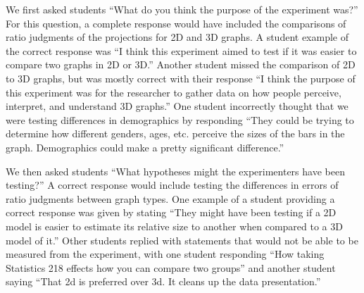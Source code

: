 \documentclass[
  12pt,
]{article}
\providecommand{\DIFdel}[1]{} %
\providecommand{\DIFadd}[1]{{\protect\color{blue} \sf #1}} %
\providecommand{\DIFdel}[1]{{\protect\color{red} [..\footnote{removed: #1} ]}} %
\providecommand{\DIFaddbegin}{} %
\providecommand{\DIFaddend}{} %
\providecommand{\DIFdelbegin}{} %
\providecommand{\DIFdelend}{} %
\newcommand{\DIFscaledelfig}{0.5}
\newlength{\DIFdelgraphicswidth} %
\newlength{\DIFdelgraphicsheight} %
\newcommand{\DIFaddincludegraphics}[2][]{{\color{blue}\fbox{\DIFOincludegraphics[#1]{#2}}}} %
\newcommand{\DIFdelincludegraphics}[2][]{%
\sbox{\DIFdelgraphicsbox}{\DIFOincludegraphics[#1]{#2}}%
\settoboxwidth{\DIFdelgraphicswidth}{\DIFdelgraphicsbox} %
\settoboxtotalheight{\DIFdelgraphicsheight}{\DIFdelgraphicsbox} %
\scalebox{\DIFscaledelfig}{%
\parbox[b]{\DIFdelgraphicswidth}{\usebox{\DIFdelgraphicsbox}\\[-\baselineskip] \rule{\DIFdelgraphicswidth}{0em}}\llap{\resizebox{\DIFdelgraphicswidth}{\DIFdelgraphicsheight}{%
\setlength{\unitlength}{\DIFdelgraphicswidth}%
\begin{picture}(1,1)%
\thicklines\linethickness{2pt} %
{\color[rgb]{1,0,0}\put(0,0){\framebox(1,1){}}}%
{\color[rgb]{1,0,0}\put(0,0){\line( 1,1){1}}}%
{\color[rgb]{1,0,0}\put(0,1){\line(1,-1){1}}}%
\end{picture}%
}\hspace*{3pt}}} %
} %
\DeclareRobustCommand{\DIFaddbegin}{\DIFOaddbegin \let\includegraphics\DIFaddincludegraphics} %
\DeclareRobustCommand{\DIFaddend}{\DIFOaddend \let\includegraphics\DIFOincludegraphics} %
\DeclareRobustCommand{\DIFdelbegin}{\DIFOdelbegin \let\includegraphics\DIFdelincludegraphics} %
\DeclareRobustCommand{\DIFdelend}{\DIFOaddend \let\includegraphics\DIFOincludegraphics} %
\begin{document}
\DIFdelbegin \DIFdel{When students were asked }\DIFdelend \DIFaddbegin \DIFadd{We first asked students }\DIFaddend ``What do you think the purpose of the
experiment was?'' \DIFdelbegin \DIFdel{, one student responded ``They could be trying to
determine how different genders, ages, etc. perceive the sizes of the
bars in the graph.Demographics could make a pretty significant
difference.}\DIFdelend \DIFaddbegin \DIFadd{For this question, a complete response would have
included the comparisons of ratio judgments of the projections for 2D
and 3D graphs. A student example of the correct response was ``I think
this experiment aimed to test if it was easier to compare two graphs in
2D or 3D.}\DIFaddend '' Another student \DIFdelbegin \DIFdel{responded }\DIFdelend \DIFaddbegin \DIFadd{missed the comparison of 2D to 3D graphs,
but was mostly correct with their response }\DIFaddend ``I think the purpose of this
experiment was for the researcher to gather data on how people perceive,
interpret, and understand 3D graphs.'' \DIFdelbegin \DIFdel{A third student correctly
commented ``I think this experiment aimed to test if it was easier to
compare two graphs in 2D or 3D.'' For this question, a complete response
would have included the comparisons of ratio judgements of the projections for 2D and 3D graphs. }\DIFdelend \DIFaddbegin \DIFadd{One student incorrectly thought
that we were testing differences in demographics by responding ``They
could be trying to determine how different genders, ages, etc. perceive
the sizes of the bars in the graph. Demographics could make a pretty
significant difference.''
}\DIFaddend 

We then asked students ``What hypotheses might the experimenters have
been testing?'' A correct response would include \DIFdelbegin \DIFdel{measuring differences
in accuracy of ratio judgements between 2D and 3D graphs. One student
correctly identified this by responding }\DIFdelend \DIFaddbegin \DIFadd{testing the differences
in errors of ratio judgments between graph types. One example of a
student providing a correct response was given by stating }\DIFaddend ``They might
have been testing if a 2D model is easier to estimate its relative size
to another when compared to a 3D model of it.'' Other students replied
with statements that would not be able to be measured from the
experiment, with one student responding ``How taking Statistics 218
effects how you can compare two groups'' and another student saying
``That 2d is preferred over 3d. It cleans up the data presentation.''
\end{document}
